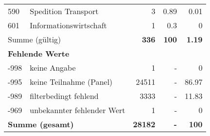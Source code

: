 \begin{longtable}{lXrrr}
        590 & \multicolumn{1}{X}{Spedition Transport} & %
          \num{3} &
          \num[round-mode=places,round-precision=2]{0,89} &
          \num[round-mode=places,round-precision=2]{0,01} \\

        601 & \multicolumn{1}{X}{Informationswirtschaft} & %
          \num{1} &
          \num[round-mode=places,round-precision=2]{0,3} &
          \num[round-mode=places,round-precision=2]{0} \\

     \midrule
     \multicolumn{2}{l}{Summe (gültig)} &
       \textbf{\num{336}} &
     \textbf{100} &
       \textbf{\num[round-mode=places,round-precision=2]{1,19}} \\
     \multicolumn{5}{l}{\textbf{Fehlende Werte}}\\
       -998 &
       keine Angabe &
         \num{1} &
        - &
         \num[round-mode=places,round-precision=2]{0} \\
       -995 &
       keine Teilnahme (Panel) &
         \num{24511} &
        - &
         \num[round-mode=places,round-precision=2]{86,97} \\
       -989 &
       filterbedingt fehlend &
         \num{3333} &
        - &
         \num[round-mode=places,round-precision=2]{11,83} \\
       -969 &
       unbekannter fehlender Wert &
         \num{1} &
        - &
         \num[round-mode=places,round-precision=2]{0} \\
     \midrule
     \multicolumn{2}{l}{\textbf{Summe (gesamt)}} &
          \textbf{\num{28182}} &
        \textbf{-} &
        \textbf{100} \\
     \bottomrule
     \end{longtable}
     
